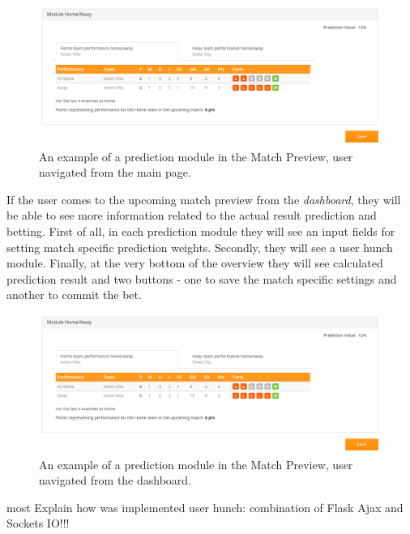 \begin{figure}[H]
	\begin{center}
		\includegraphics[width=.90\linewidth,natwidth=610,natheight=642]{impl/images/matchoverviewex_from_main_page}
		\caption{An example of a prediction module in the Match Preview, user navigated from the main page.} \label{fig:using: matchoverviewex_from_main_page}
	\end{center}
\end{figure}

If the user comes to the upcoming match preview from the \emph{dashboard}, they will be able to see more information related to the actual result prediction and betting.
First of all, in each prediction module they will see an input fields for setting match specific prediction weights. Secondly, they will see a user hunch module. Finally, at the very bottom of the overview they will see calculated prediction result and two buttons - one to save the match specific settings and another to commit the bet.

\begin{figure}[H]
	\begin{center}
		\includegraphics[width=.90\linewidth,natwidth=610,natheight=642]{impl/images/matchoverviewex_from_main_page}
		\caption{An example of a prediction module in the Match Preview, user navigated from the dashboard.} \label{fig:using: matchoverviewex_from_main_page}
	\end{center}
\end{figure}


 most Explain how was implemented user hunch: combination of Flask Ajax and Sockets IO!!!
 
